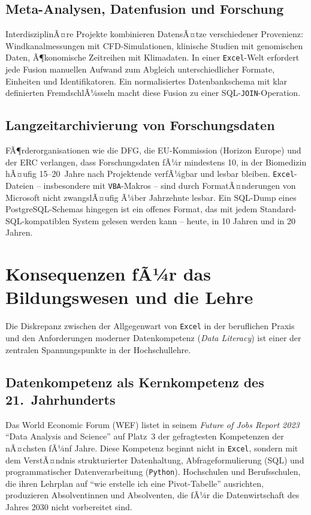 ﻿\documentclass[12pt,a4paper]{report}
\theoremstyle{definition}
\theoremstyle{remark}
\newcommand{\excel}{\texttt{Excel}}
\newcommand{\vba}{\texttt{VBA}}
\newcommand{\py}{\texttt{Python}}
\newcommand{\code}[1]{\texttt{#1}}
\begin{document}
\subsection{Meta-Analysen, Datenfusion und Forschung}

InterdisziplinÃ¤re Projekte kombinieren DatensÃ¤tze verschiedener
Provenienz: Windkanalmessungen mit CFD-Simulationen, klinische
Studien mit genomischen Daten, Ã¶konomische Zeitreihen mit Klimadaten.
In einer \excel-Welt erfordert jede Fusion manuellen Aufwand zum
Abgleich unterschiedlicher Formate, Einheiten und Identifikatoren.
Ein normalisiertes Datenbankschema mit klar definierten FremdschlÃ¼sseln
macht diese Fusion zu einer SQL-\code{JOIN}-Operation.

\subsection{Langzeitarchivierung von Forschungsdaten}

FÃ¶rderorganisationen wie die DFG, die EU-Kommission (Horizon Europe)
und der ERC verlangen, dass Forschungsdaten fÃ¼r mindestens 10,
in der Biomedizin hÃ¤ufig 15--20~Jahre nach Projektende verfÃ¼gbar und
lesbar bleiben.
\excel-Dateien -- insbesondere mit \vba-Makros -- sind durch
FormatÃ¤nderungen von Microsoft nicht zwangslÃ¤ufig Ã¼ber Jahrzehnte
lesbar.
Ein SQL-Dump eines PostgreSQL-Schemas hingegen ist ein offenes Format,
das mit jedem Standard-SQL-kompatiblen System gelesen werden kann --
heute, in 10 Jahren und in 20 Jahren.

\section{Konsequenzen fÃ¼r das Bildungswesen und die Lehre}

Die Diskrepanz zwischen der Allgegenwart von \excel{} in der beruflichen
Praxis und den Anforderungen moderner Datenkompetenz
(\textit{Data Literacy}) ist einer der zentralen Spannungspunkte
in der Hochschullehre.

\subsection{Datenkompetenz als Kernkompetenz des 21.\ Jahrhunderts}

Das World Economic Forum (WEF) listet in seinem
\textit{Future of Jobs Report 2023} ``Data Analysis and Science''
auf Platz~3 der gefragtesten Kompetenzen der nÃ¤chsten fÃ¼nf Jahre.
Diese Kompetenz beginnt nicht in \excel{}, sondern mit dem VerstÃ¤ndnis
strukturierter Datenhaltung, Abfrageformulierung (SQL) und
programmatischer Datenverarbeitung (\py).
Hochschulen und Berufsschulen, die ihren Lehrplan auf
``wie erstelle ich eine Pivot-Tabelle'' ausrichten, produzieren
Absolventinnen und Absolventen, die fÃ¼r die Datenwirtschaft
des Jahres 2030 nicht vorbereitet sind.
\end{document}
